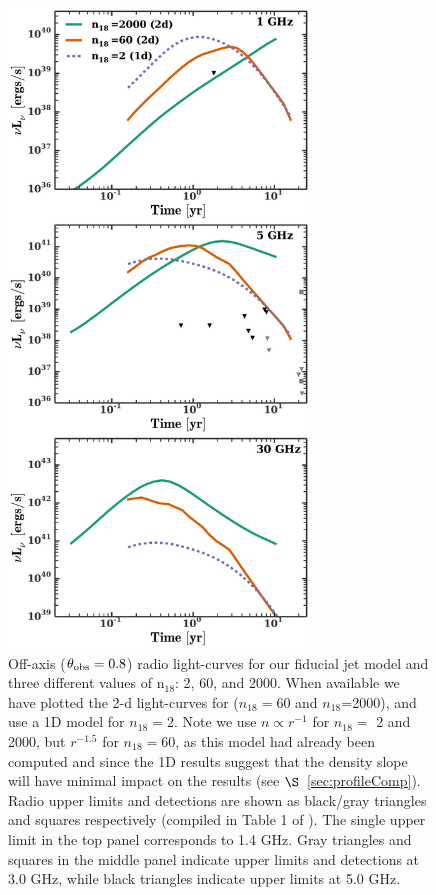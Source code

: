 \documentclass[usenatbib,fleqn]{mnras}
\begin{document}
\begin{figure} 
  \includegraphics[width=8cm]{lightcurves.pdf}
  \caption{\label{fig:upper_limits} Off-axis ($\theta_{\rm obs}=0.8$)
    radio light-curves for our fiducial jet model and three different
    values of n$_{18}$: 2, 60, and 2000. When available we have
    plotted the 2-d light-curves for ($n_{18}=60$ and $n_{18}$=2000),
    and use a 1D model for $n_{18}=2$. Note we use $n\propto r^{-1}$
    for $n_{18}=$ 2 and 2000, but $r^{-1.5}$ for $n_{18}=60$, as this
    model had already been computed and since the 1D results suggest
    that the density slope will have minimal impact on the results
    (see $\S$~\ref{sec:profileComp}).  Radio upper limits and
    detections are shown as black/gray triangles and squares
    respectively (compiled in Table 1 of \citealt{Mimica+2015}). The
    single upper limit in the top panel corresponds to 1.4 GHz. Gray
    triangles and squares in the middle panel indicate upper limits
    and detections at 3.0 GHz, while black triangles indicate upper
    limits at 5.0 GHz.}
\end{figure}
\end{document}
